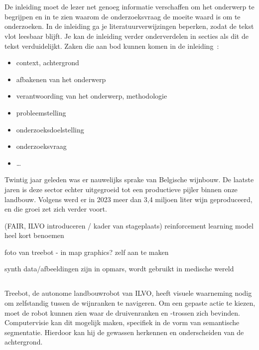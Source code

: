 
\chapter{}%
\label{ch:inleiding}

De inleiding moet de lezer net genoeg informatie verschaffen om het onderwerp te begrijpen en in te zien waarom de onderzoeksvraag de moeite waard is om te onderzoeken. In de inleiding ga je literatuurverwijzingen beperken, zodat de tekst vlot leesbaar blijft. Je kan de inleiding verder onderverdelen in secties als dit de tekst verduidelijkt. Zaken die aan bod kunnen komen in de inleiding~\autocite{Pollefliet2011}:

\begin{itemize}
  \item context, achtergrond
  \item afbakenen van het onderwerp
  \item verantwoording van het onderwerp, methodologie
  \item probleemstelling
  \item onderzoeksdoelstelling
  \item onderzoeksvraag
  \item \ldots
\end{itemize}

Twintig jaar geleden was er nauwelijks sprake van Belgische wijnbouw. De laatste jaren is deze sector echter uitgegroeid tot een productieve pijler binnen onze landbouw. Volgens \textcite{FODEconomie2024} werd er in 2023 meer dan 3,4 miljoen liter wijn geproduceerd, en die groei zet zich verder voort. 

(FAIR, ILVO introduceren / kader van stageplaats) reinforcement learning model heel kort benoemen

foto van treebot - in map graphics? zelf aan te maken

synth data/afbeeldingen zijn in opmars, wordt gebruikt in medische wereld

\section{}%
\label{sec:probleemstelling}

Treebot, de autonome landbouwrobot van ILVO, heeft visuele waarneming nodig om zelfstandig tussen de wijnranken te navigeren. Om een gepaste actie te kiezen, moet de robot kunnen zien waar de druivenranken en -trossen zich bevinden. Computervisie kan dit mogelijk maken, specifiek in de vorm van semantische segmentatie. Hierdoor kan hij de gewassen herkennen en onderscheiden van de achtergrond.

